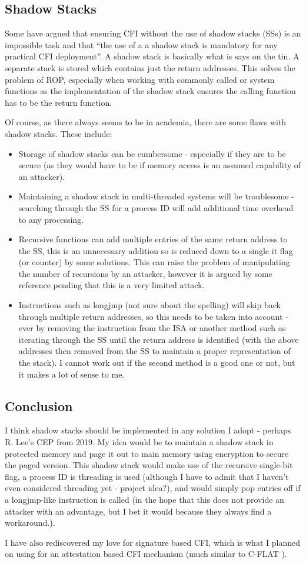 \subsection{Shadow Stacks}
Some \cite{Christoulakis2016} have argued that ensuring CFI without the use of shadow stacks (SSs) is an impossible task and that “the use of a a shadow stack is mandatory for any practical CFI deployment”. A shadow stack is basically what is says on the tin. A separate stack is stored which contains just the return addresses. This solves the problem of ROP, especially when working with commonly called or system functions as the implementation of the shadow stack ensures the calling function has to be the return function.

Of course, as there always seems to be in academia, there are some flaws with shadow stacks. These include:
\begin{itemize}
	\item Storage of shadow stacks can be cumbersome - especially if they are to be secure (as they would have to be if memory access is an assumed capability of an attacker).
	\item Maintaining a shadow stack in multi-threaded systems will be troublesome - searching through the SS for a process ID will add additional time overhead to any processing.
	\item Recursive functions can add multiple entries of the same return address to the SS, this is an unnecessary addition so is reduced down to a single it flag (or counter) by some solutions. This can raise the problem of manipulating the number of recursions by an attacker, however it is argued by some reference pending that this is a very limited attack.
	\item Instructions such as longjmp (not sure about the spelling) will skip back through multiple return addresses, so this needs to be taken into account - ever by removing the instruction from the ISA or another method such as iterating through the SS until the return address is identified (with the above addresses then removed from the SS to maintain a proper representation of the stack). I cannot work out if the second method is a good one or not, but it makes a lot of sense to me.
\end{itemize}

\subsection{Conclusion}
I think shadow stacks should be implemented in any solution I adopt - perhaps R. Lee’s CEP from 2019. My idea would be to maintain a shadow stack in protected memory and page it out to main memory using encryption to secure the paged version. This shadow stack would make use of the recursive single-bit flag, a process ID is threading is used (although I have to admit that I haven’t even considered threading yet - project idea?), and would simply pop entries off if a longjmp-like instruction is called (in the hope that this does not provide an attacker with an advantage, but I bet it would because they always find a workaround.).

I have also rediscovered my love for signature based CFI, which is what I planned on using for an attestation based CFI mechanism (much similar to C-FLAT \cite{Abera2016}).